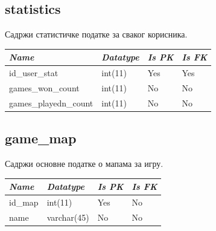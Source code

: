 \subsection{statistics}
Садржи статистичке податке за сваког корисника.

\begin{table}[h!]
\centering
\small

    \begin{tabular}{ | m{} | m{} | m{} | m{} | }
    \hline
        \cellcolor{blue!25}\textbf{\textit{Name}} &

        \cellcolor{blue!25}\textbf{\textit{Datatype}} &
        \cellcolor{blue!25}\textbf{\textit{Is PK}} &
        \cellcolor{blue!25}\textbf{\textit{Is FK}} \\
    \hline
    \hline
        id\_user\_stat & int(11) & Yes & Yes \\
    \hline
        games\_won\_count & int(11) & No & No \\
    \hline
        games\_playedn\_count & int(11) & No & No \\
    \hline
    \end{tabular}

\end{table}

\newpage

\subsection{game\_map}
Садржи основне податке о мапама за игру.

\begin{table}[h!]
\centering
\small

    \begin{tabular}{ | m{} | m{} | m{} | m{} | }
    \hline
        \cellcolor{blue!25}\textbf{\textit{Name}} &

        \cellcolor{blue!25}\textbf{\textit{Datatype}} &
        \cellcolor{blue!25}\textbf{\textit{Is PK}} &
        \cellcolor{blue!25}\textbf{\textit{Is FK}} \\
    \hline
    \hline
        id\_map & int(11) & Yes & No \\
    \hline
        name & varchar(45) & No & No \\
    \hline
    \end{tabular}

\end{table}

